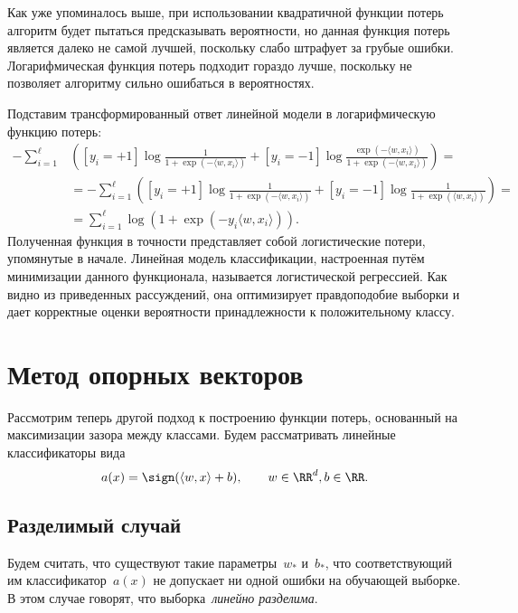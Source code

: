 \documentclass[12pt,fleqn]{article}
\begin{document}
Как уже упоминалось выше, при использовании квадратичной функции потерь
алгоритм будет пытаться предсказывать вероятности,
но данная функция потерь является далеко не самой лучшей,
поскольку слабо штрафует за грубые ошибки.
Логарифмическая функция потерь подходит гораздо лучше, поскольку не позволяет алгоритму
сильно ошибаться в вероятностях.

Подставим трансформированный ответ линейной модели в логарифмическую функцию потерь:
\begin{align*}
    -\sum_{i = 1}^{\ell} &\left(
        [y_i = +1]
        \log \frac{1}{1 + \exp(-\langle w, x_i \rangle)}
        +
        [y_i = -1]
        \log \frac{\exp(-\langle w, x_i \rangle)}{1 + \exp(-\langle w, x_i \rangle)}
    \right)
    =\\
    &=
    -\sum_{i = 1}^{\ell} \left(
        [y_i = +1]
        \log \frac{1}{1 + \exp(-\langle w, x_i \rangle)}
        +
        [y_i = -1]
        \log \frac{1}{1 + \exp(\langle w, x_i \rangle)}
    \right)
    =\\
    &=
    \sum_{i = 1}^{\ell}
        \log \left(
            1 + \exp(-y_i \langle w, x_i \rangle)
        \right).
\end{align*}
Полученная функция в точности представляет собой логистические потери,
упомянутые в начале.
Линейная модель классификации, настроенная путём минимизации данного функционала,
называется логистической регрессией.
Как видно из приведенных рассуждений, она оптимизирует
правдоподобие выборки и дает корректные оценки вероятности принадлежности к положительному классу.

\section{Метод опорных векторов}

Рассмотрим теперь другой подход к построению функции потерь,
основанный на максимизации зазора между классами.
Будем рассматривать линейные классификаторы вида
\[
    a(x) = \sign (\langle w, x \rangle + b), \qquad w \in \RR^d, b \in \RR.
\]

\subsection{Разделимый случай}
Будем считать, что существуют такие параметры~$w_*$ и~$b_*$,
что соответствующий им классификатор~$a(x)$ не допускает ни одной ошибки
на обучающей выборке.
В этом случае говорят, что выборка~\emph{линейно разделима}.
\end{document}
